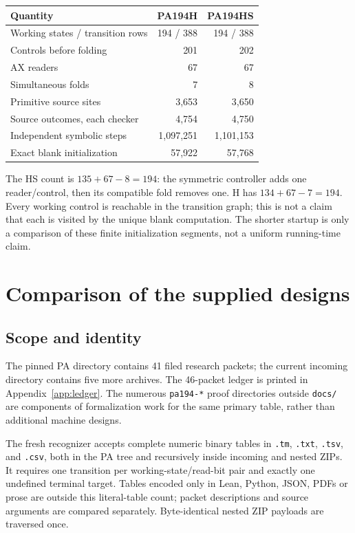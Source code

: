 \documentclass[11pt,letterpaper]{article}
\newcommand{\file}[1]{\texttt{\nolinkurl{#1}}}
\begin{document}
\begin{center}
\begin{tabular}{@{}lrr@{}}\toprule
Quantity & PA194H & PA194HS\\\midrule
Working states / transition rows &194 / 388&194 / 388\\
Controls before folding &201&202\\
AX readers &67&67\\
Simultaneous folds &7&8\\
Primitive source sites &3,653&3,650\\
Source outcomes, each checker &4,754&4,750\\
Independent symbolic steps &1,097,251&1,101,153\\
Exact blank initialization &57,922&57,768\\\bottomrule
\end{tabular}
\end{center}
The HS count is $135+67-8=194$: the symmetric controller adds one
reader/control, then its compatible fold removes one. H has
$134+67-7=194$. Every working control is reachable in the transition graph;
this is not a claim that each is visited by the unique blank computation.
The shorter startup is only a comparison of these finite initialization
segments, not a uniform running-time claim.

\section{Comparison of the supplied designs}
\label{sec:comparison}

\subsection{Scope and identity}

The pinned PA directory contains 41 filed research packets; the current
incoming directory contains five more archives. The 46-packet ledger is
printed in Appendix~\ref{app:ledger}. The numerous \file{pa194-*} proof
directories outside \file{docs/} are components of formalization work for
the same primary table, rather than additional machine designs.

The fresh recognizer accepts complete numeric binary tables in
\file{.tm}, \file{.txt}, \file{.tsv}, and \file{.csv}, both in the PA tree
and recursively inside incoming and nested ZIPs. It requires one transition
per working-state/read-bit pair and exactly one undefined terminal target.
Tables encoded only in Lean, Python, JSON, PDFs or prose are outside this
literal-table count; packet descriptions and source arguments are compared
separately. Byte-identical nested ZIP payloads are traversed once.
\end{document}
